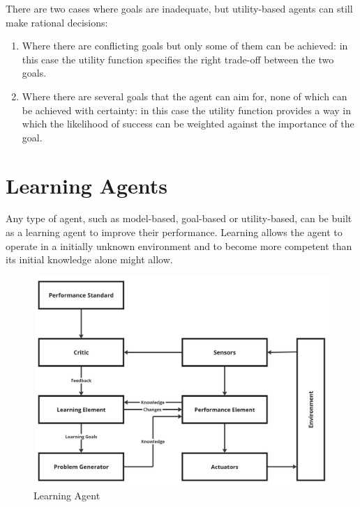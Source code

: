 \documentclass{article}
\begin{document}
There are two cases where goals are inadequate, but utility-based agents can still make rational decisions:
\begin{enumerate}
    \item Where there are conflicting goals but only some of them can be achieved: in this case the utility function specifies the right trade-off between the two goals.
    \item Where there are several goals that the agent can aim for, none of which can be achieved with certainty: in this case the utility function provides a way in which the likelihood of success can be weighted against the importance of the goal.
\end{enumerate}

\section{Learning Agents}
Any type of agent, such as model-based, goal-based or utility-based, can be built as a learning agent to improve their performance. Learning allows the agent to operate in a initially unknown environment and to become more competent than its initial knowledge alone might allow. 

\begin{figure}[h]
    \centering
    \includegraphics[width=0.75\linewidth]{images/Learning Agent.jpg}
    \caption{Learning Agent}
    \label{fig:learning_agent}
\end{figure}
\end{document}
